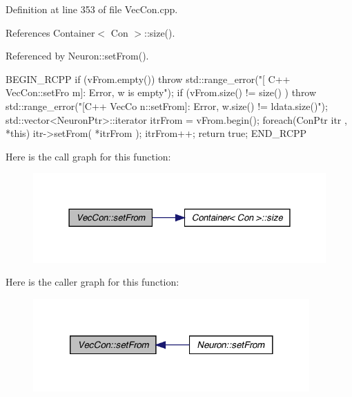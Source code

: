 Definition at line 353 of file VecCon.cpp.



References Container$<$ Con $>$::size().



Referenced by Neuron::setFrom().


\begin{DoxyCode}
                                                     {
        BEGIN_RCPP
                if (vFrom.empty()) { throw std::range_error("[ C++ VecCon::setFro
      m]: Error, w is empty"); }
                if (vFrom.size() != size() ) { throw std::range_error("[C++ VecCo
      n::setFrom]: Error, w.size() != ldata.size()"); }
                std::vector<NeuronPtr>::iterator itrFrom = vFrom.begin();
                foreach(ConPtr itr , *this)     {
                        itr->setFrom( *itrFrom );
                        itrFrom++;
                }
                return true;
                END_RCPP
}
\end{DoxyCode}


Here is the call graph for this function:
\nopagebreak
\begin{figure}[H]
\begin{center}
\leavevmode
\includegraphics[width=328pt]{class_vec_con_ad5327f9345cc4dee223ba7f1038ad9ec_cgraph}
\end{center}
\end{figure}




Here is the caller graph for this function:
\nopagebreak
\begin{figure}[H]
\begin{center}
\leavevmode
\includegraphics[width=300pt]{class_vec_con_ad5327f9345cc4dee223ba7f1038ad9ec_icgraph}
\end{center}
\end{figure}


